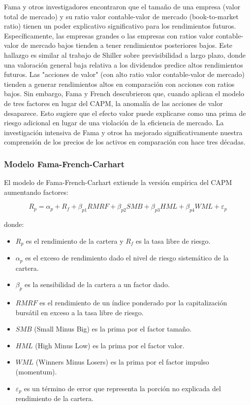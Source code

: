 Fama y otros investigadores encontraron que el tamaño de una empresa (valor total de mercado) y su ratio valor contable-valor de mercado (book-to-market ratio) tienen un poder explicativo significativo para los rendimientos futuros. Específicamente, las empresas grandes o las empresas con ratios valor contable-valor de mercado bajos tienden a tener rendimientos posteriores bajos. Este hallazgo es similar al trabajo de Shiller sobre previsibilidad a largo plazo, donde una valoración general baja relativa a los dividendos predice altos rendimientos futuros. Las "acciones de valor" (con alto ratio valor contable-valor de mercado) tienden a generar rendimientos altos en comparación con acciones con ratios bajos. Sin embargo, Fama y French descubrieron que, cuando aplican el modelo de tres factores en lugar del CAPM, la anomalía de las acciones de valor desaparece. Esto sugiere que el efecto valor puede explicarse como una prima de riesgo adicional en lugar de una violación de la eficiencia de mercado. La investigación intensiva de Fama y otros ha mejorado significativamente nuestra comprensión de los precios de los activos en comparación con hace tres décadas.

\subsubsection{Modelo Fama-French-Carhart}

El modelo de Fama-French-Carhart extiende la versión empírica del CAPM aumentando factores:

\begin{equation}
R_p = \alpha_p + R_f + \beta_{p1}RMRF + \beta_{p2}SMB + \beta_{p3}HML + \beta_{p4}WML + \varepsilon_p
\end{equation}

donde:
\begin{itemize}
\item $R_p$ es el rendimiento de la cartera y $R_f$ es la tasa libre de riesgo.
\item $\alpha_p$ es el exceso de rendimiento dado el nivel de riesgo sistemático de la cartera.
\item $\beta_p$ es la sensibilidad de la cartera a un factor dado.
\item $RMRF$ es el rendimiento de un índice ponderado por la capitalización bursátil en exceso a la tasa libre de riesgo.
\item $SMB$ (Small Minus Big) es la prima por el factor tamaño.
\item $HML$ (High Minus Low) es la prima por el factor valor.
\item $WML$ (Winners Minus Losers) es la prima por el factor impulso (momentum).
\item $\varepsilon_p$ es un término de error que representa la porción no explicada del rendimiento de la cartera.
\end{itemize}


